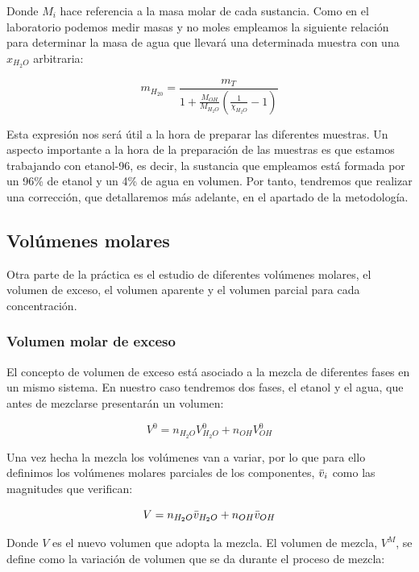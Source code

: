 \documentclass[a4paper,12pt,titlepage]{article}
\begin{document}
Donde $M_i$ hace referencia a la masa molar de cada sustancia. Como en el laboratorio podemos medir masas y no moles empleamos la siguiente relación para determinar la masa de agua que llevará una determinada muestra con una $x_{H_2O}$ arbitraria:

\begin{equation}
    m_{H_20} = \frac{m_T}{1+\frac{M_{OH}}{M_{H_2O}}\left(\frac{1}{\chi_{H_2O}}-1\right)}
    \label{m_agua}
\end{equation}

Esta expresión nos será útil a la hora de preparar las diferentes muestras. Un aspecto importante a la hora de la preparación de las muestras es que estamos trabajando con etanol-96, es decir, la sustancia que empleamos está formada por un 96\% de etanol y un 4\% de agua en volumen. Por tanto, tendremos que realizar una corrección, que detallaremos más adelante, en el apartado de la metodología.

\subsection{Volúmenes molares}

Otra parte de la práctica es el estudio de diferentes volúmenes molares, el volumen de exceso, el volumen aparente y el volumen parcial para cada concentración.

\subsubsection{Volumen molar de exceso}

El concepto de volumen de exceso está asociado a la mezcla de diferentes fases en un mismo sistema. En nuestro caso tendremos dos fases, el etanol y el agua, que antes de mezclarse presentarán un volumen:

\begin{equation}
    V^0 = n_{H_2O}V_{H_2O}^0 + n_{OH}V_{OH}^0
    \label{V_exc}
\end{equation}

Una vez hecha la mezcla los volúmenes van a variar, por lo que para ello definimos los volúmenes molares parciales de los componentes, $\Bar{v}_i$ como las magnitudes que verifican:

\begin{equation}
    V = n_{H_2O}\Bar{v}_{H_2O} + n_{OH}\bar{v}_{OH}
\end{equation}

Donde $V$ es el nuevo volumen que adopta la mezcla. El volumen de mezcla, $V^M$, se define como la variación de volumen que se da durante el proceso de mezcla:
\end{document}
